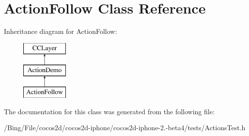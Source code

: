 \hypertarget{interface_action_follow}{\section{Action\-Follow Class Reference}
\label{interface_action_follow}
}
Inheritance diagram for Action\-Follow\-:\begin{figure}[H]
\begin{center}
\leavevmode
\includegraphics[height=3.000000cm]{interface_action_follow}
\end{center}
\end{figure}


The documentation for this class was generated from the following file\-:\begin{DoxyCompactItemize}
\item 
/\-Bing/\-File/cocos2d/cocos2d-\/iphone/cocos2d-\/iphone-\/2.-\/beta4/tests/Actions\-Test.\-h\end{DoxyCompactItemize}
